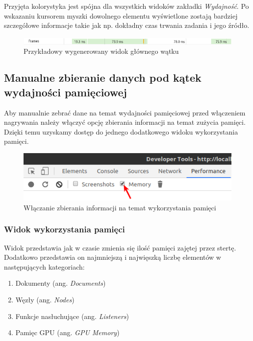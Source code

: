 \documentclass[polish, twoside, 12pt]{mwart}
\begin{document}
Przyjęta kolorystyka jest spójna dla wszystkich widoków zakładki \emph{Wydajność}. Po wskazaniu kursorem myszki dowolnego elementu wyświetlone zostają bardziej szczegółowe informacje takie jak np. dokładny czas trwania zadania i jego źródło.

\begin{figure}[ht]
  \includegraphics[width=\textwidth]{chrome-devtools-performance-frames-view.png}
	\caption{Przykładowy wygenerowany widok głównego wątku}
\end{figure}

\subsection{Manualne zbieranie danych pod kątek wydajności pamięciowej}

Aby manualnie zebrać dane na temat wydajności pamięciowej przed włączeniem nagrywania należy włączyć opcję zbierania informacji na temat zużycia pamięci. Dzięki temu uzyskamy dostęp do jednego dodatkowego widoku wykorzystania pamięci.

\begin{figure}[ht]
  \includegraphics[width=\textwidth]{chrome-devtools-performance-memory-checkbox.png}
	\caption{Włączanie zbierania informacji na temat wykorzystania pamięci}
\end{figure}

\subsubsection{Widok wykorzystania pamięci}

Widok przedstawia jak w czasie zmienia się ilość pamięci zajętej przez stertę. Dodatkowo przedstawia on najmniejszą i najwięszką liczbę elementów w następujących kategoriach:

\begin{enumerate}
  \item Dokumenty (ang. \emph{Documents})
  \item Węzły (ang. \emph{Nodes})
  \item Funkcje nasłuchujące (ang. \emph{Listeners})
  \item Pamięc GPU (ang. \emph{GPU Memory})
\end{enumerate}
\end{document}
